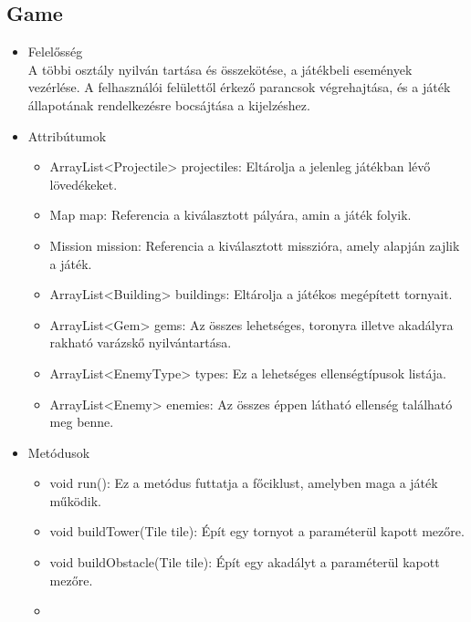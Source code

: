 \subsection{Game}
\begin{itemize}
\item Felelősség\\
A többi osztály nyilván tartása és összekötése, a játékbeli események vezérlése. A felhasználói felülettől érkező parancsok végrehajtása, és a játék állapotának rendelkezésre bocsájtása a kijelzéshez.
\item Attribútumok\\
	\begin{itemize}
		\item ArrayList<Projectile> projectiles: Eltárolja a jelenleg játékban lévő lövedékeket.
		\item Map map: Referencia a kiválasztott pályára, amin a játék folyik.
		\item Mission mission: Referencia a kiválasztott misszióra, amely alapján zajlik a játék.
		\item ArrayList<Building> buildings: Eltárolja a játékos megépített tornyait.
		\item ArrayList<Gem> gems: Az összes lehetséges, toronyra illetve akadályra rakható varázskő nyilvántartása.
		\item ArrayList<EnemyType> types: Ez a lehetséges ellenségtípusok listája.
		\item ArrayList<Enemy> enemies: Az összes éppen látható ellenség található meg benne.
	\end{itemize}
\item Metódusok\\
	\begin{itemize}
		\item void run(): Ez a metódus futtatja a főciklust, amelyben maga a játék működik.
		\item void buildTower(Tile tile): Épít egy tornyot a paraméterül kapott mezőre. 
		\item void buildObstacle(Tile tile): Épít egy akadályt a paraméterül kapott mezőre. 
		\item {}
	\end{itemize}
\end{itemize}

